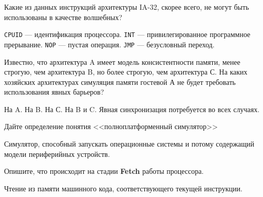 \documentclass[a4paper, addpoints]{exam}
\begin{document}
\begin{questions}

\question[1] Какие из данных инструкций архитектуры IA-32, скорее всего, не могут быть использованы в качестве волшебных?
\begin{choices}
	\choice \texttt{CPUID} --- идентификация процессора.
	\correctchoice \texttt{INT} --- привилегированное программное прерывание.
	\choice \texttt{NOP} --- пустая операция.
	\correctchoice \texttt{JMP} --- безусловный переход.
\end{choices}


\question[1] Известно, что архитектура A имеет модель консистентности памяти, менее строгую, чем архитектура B, но более строгую, чем архитектура С. На каких хозяйских архитектурах симуляция памяти гостевой А не будет требовать использования явных барьеров?
\begin{choices}
    \correctchoice На A.
    \correctchoice На B.
    \choice На С.
    \choice На B и C.
    \choice Явная синхронизация потребуется во всех случаях.
\end{choices}




\question[3] Дайте определение понятия <<полноплатформенный симулятор>>
\begin{solution}[2cm]
Симулятор,  способный запускать операционные системы и потому содержащий модели периферийных устройств.
\end{solution}


\question[3] Опишите, что происходит на стадии \textbf{Fetch} работы процессора.
\begin{solution}[1cm]
Чтение из памяти машинного кода, соответствующего текущей инструкции.
\end{solution}


\end{questions}
\end{document}
